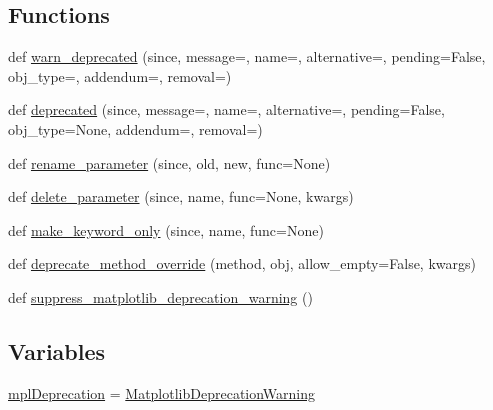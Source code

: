 \subsection*{Functions}
\begin{DoxyCompactItemize}
\item 
def \hyperlink{namespacematplotlib_1_1__api_1_1deprecation_a328933cc8e4e030247d96e1fca1a9c8f}{warn\+\_\+deprecated} (since, message=\textquotesingle{}\textquotesingle{}, name=\textquotesingle{}\textquotesingle{}, alternative=\textquotesingle{}\textquotesingle{}, pending=False, obj\+\_\+type=\textquotesingle{}\textquotesingle{}, addendum=\textquotesingle{}\textquotesingle{}, removal=\textquotesingle{}\textquotesingle{})
\item 
def \hyperlink{namespacematplotlib_1_1__api_1_1deprecation_a1b5ff66854ee6a80dd3f3b65a63168eb}{deprecated} (since, message=\textquotesingle{}\textquotesingle{}, name=\textquotesingle{}\textquotesingle{}, alternative=\textquotesingle{}\textquotesingle{}, pending=False, obj\+\_\+type=None, addendum=\textquotesingle{}\textquotesingle{}, removal=\textquotesingle{}\textquotesingle{})
\item 
def \hyperlink{namespacematplotlib_1_1__api_1_1deprecation_aa3f0c8301db6195d8340c71376926325}{rename\+\_\+parameter} (since, old, new, func=None)
\item 
def \hyperlink{namespacematplotlib_1_1__api_1_1deprecation_a5014ececfdc3ae49f05309499fe2cc4f}{delete\+\_\+parameter} (since, name, func=None, kwargs)
\item 
def \hyperlink{namespacematplotlib_1_1__api_1_1deprecation_ad02d93f42fc564edba6813c27483df9c}{make\+\_\+keyword\+\_\+only} (since, name, func=None)
\item 
def \hyperlink{namespacematplotlib_1_1__api_1_1deprecation_aae638184cd64ea398cc18609c1290674}{deprecate\+\_\+method\+\_\+override} (method, obj, allow\+\_\+empty=False, kwargs)
\item 
def \hyperlink{namespacematplotlib_1_1__api_1_1deprecation_a0ba07ebcb4c5d8a193b7bb41adc2cae1}{suppress\+\_\+matplotlib\+\_\+deprecation\+\_\+warning} ()
\end{DoxyCompactItemize}
\subsection*{Variables}
\begin{DoxyCompactItemize}
\item 
\hyperlink{namespacematplotlib_1_1__api_1_1deprecation_a767421315a82de1665a839b9585cc561}{mpl\+Deprecation} = \hyperlink{classmatplotlib_1_1__api_1_1deprecation_1_1MatplotlibDeprecationWarning}{Matplotlib\+Deprecation\+Warning}
\end{DoxyCompactItemize}


